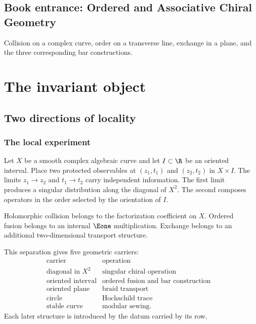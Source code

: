\cleardoublepage
{}
{}
\chapter*{Book entrance: Ordered and Associative Chiral Geometry}
\begin{summarybox}
Collision on a complex curve, order on a transverse line, exchange in a plane, and the three corresponding bar constructions.
\end{summarybox}
\part{The invariant object}

\chapter{Two directions of locality}
\section{The local experiment}
Let $X$ be a smooth complex algebraic curve and let $I\subset\R$ be an oriented interval. Place two protected observables at $(z_1,t_1)$ and $(z_2,t_2)$ in $X\times I$. The limits $z_1\to z_2$ and $t_1\to t_2$ carry independent information. The first limit produces a singular distribution along the diagonal of $X^2$. The second composes operators in the order selected by the orientation of $I$.

\begin{principle}
Holomorphic collision belongs to the factorization coefficient on $X$. Ordered fusion belongs to an internal $\Eone$ multiplication. Exchange belongs to an additional two-dimensional transport structure.
\end{principle}

This separation gives five geometric carriers:
\[
\begin{array}{c|c}
\text{carrier}&\text{operation}\\ \hline
\text{diagonal in }X^2&\text{singular chiral operation}\\
\text{oriented interval}&\text{ordered fusion and bar construction}\\
\text{oriented plane}&\text{braid transport}\\
\text{circle}&\text{Hochschild trace}\\
\text{stable curve}&\text{modular sewing}.
\end{array}
\]
Each later structure is introduced by the datum carried by its row.

